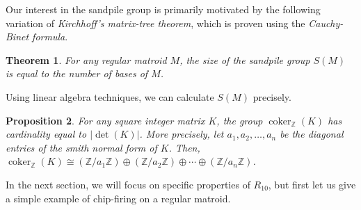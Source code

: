\documentclass[12p]{amsart}
\numberwithin{equation}{section}
\theoremstyle{plain}
\newtheorem{thm}{Theorem}[section]
\newtheorem{prop}[thm]{Proposition}
\theoremstyle{definition}
\newcommand{\Z}{\mathbb {Z}}
\DeclareMathOperator{\coker}{coker}
\begin{document}
Our interest in the sandpile group is primarily motivated by the following variation of \emph{Kirchhoff's matrix-tree theorem}, which is proven using the \emph{Cauchy-Binet formula}. 

\begin{thm}\cite[Theorem 3.3.2]{Merino} For any regular matroid $M$, the size of the sandpile group $S(M)$ is equal to the number of bases of $M$.
\end{thm}

Using linear algebra techniques, we can calculate $S(M)$ precisely. 

\begin{prop}\cite[Section 8]{Biggs99}\label{prop:smith_normal}
    For any square integer matrix $K$, the group $\coker_{\Z}(K)$ has cardinality equal to $|\det(K)|$. More precisely, let $a_1,a_2, \dots, a_n$ be the diagonal entries of the \emph{smith normal form} of $K$. Then, $\coker_{\Z}(K) \cong (\Z/{a_1}\Z) \oplus (\Z/{a_2}\Z) \oplus \cdots \oplus (\Z/{a_n}\Z)$.
\end{prop} 

In the next section, we will focus on specific properties of $R_{10}$, but first let us give a simple example of chip-firing on a regular matroid.  
\end{document}
